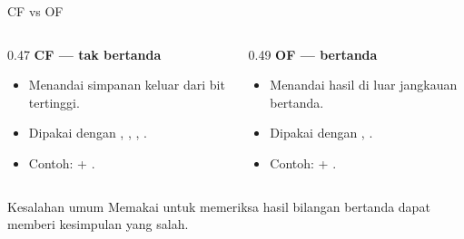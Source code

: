 \documentclass[aspectratio=169,11pt]{beamer}
\begin{document}
\begin{frame}{CF vs OF}
\small
\begin{columns}[t]
\begin{column}{0.47\textwidth}
    {\color{obeTeal}\bfseries CF --- tak bertanda}\\[0.25em]
    \begin{itemize}
        \item Menandai simpanan keluar dari bit tertinggi.
        \item Dipakai dengan , , ,
              .
        \item Contoh:  + .
    \end{itemize}
\end{column}
\begin{column}{0.49\textwidth}
    {\color{obeMaroon}\bfseries OF --- bertanda}\\[0.25em]
    \begin{itemize}
        \item Menandai hasil di luar jangkauan bertanda.
        \item Dipakai dengan , .
        \item Contoh:  + .
    \end{itemize}
\end{column}
\end{columns}

\vspace{0.5em}
\begin{alertblock}{Kesalahan umum}
\small Memakai  untuk memeriksa hasil bilangan bertanda
dapat memberi kesimpulan yang salah.
\end{alertblock}
\end{frame}
\end{document}
